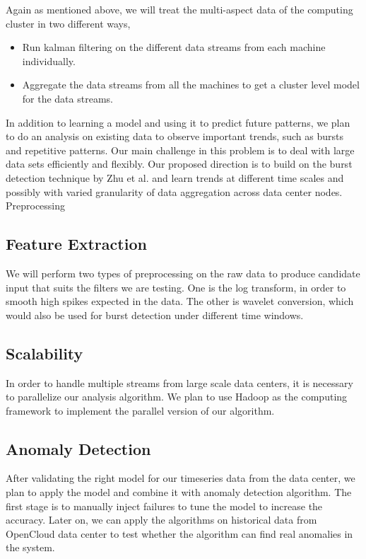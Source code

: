 Again as mentioned above, we will treat the multi-aspect data of the computing cluster in two different ways,

\begin{itemize}
\item Run kalman filtering on the different data streams from each machine individually.
\item Aggregate the data streams from all the machines to get a cluster level model for the data streams.
\end{itemize}

In addition to learning a model and using it to predict future patterns, we plan to do an analysis on existing data to observe important trends, such as bursts and repetitive patterns. Our main challenge in this problem is to deal with large data sets efficiently and flexibly. Our proposed direction is to build on the burst detection technique by Zhu et al. \cite{Zhu2003} and learn trends at different time scales and possibly with varied granularity of data aggregation across data center nodes.
Preprocessing

\subsection{Feature Extraction}
\label{sec:method:features}
We will perform two types of preprocessing on the raw data to produce candidate input that suits the filters we are testing. One is the log transform, in order to smooth high spikes expected in the data. The other is wavelet conversion, which would also be used for burst detection under different time windows.

\subsection{Scalability}
\label{sec:method:scale}
In order to handle multiple streams from large scale data centers, it is necessary to parallelize our analysis algorithm. We plan to use Hadoop as the computing framework to implement the parallel version of our algorithm.  

\subsection{Anomaly Detection}
\label{sec:method:anomaly}
After validating the right model for our timeseries data from the data center, we plan to apply the model and combine it with anomaly detection algorithm. The first stage is to manually inject failures to tune the model to increase the accuracy. Later on, we can apply the algorithms on historical data from OpenCloud data center to test whether the algorithm can find real anomalies in the system.



\newpage
{}



